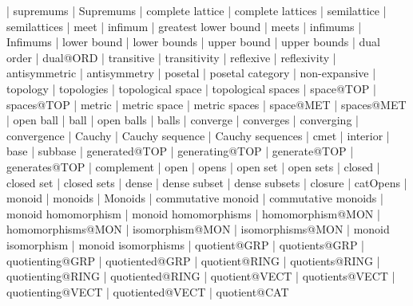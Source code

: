     |   supremums
    |   Supremums
    |   complete lattice
    |   complete lattices
    |   semilattice
    |   semilattices
    |   meet
    |   infimum
    |   greatest lower bound
    |   meets
    |   infimums
    |   Infimums
    |   lower bound
    |   lower bounds
    |   upper bound
    |   upper bounds
    |   dual order
    |   dual@ORD
    |   transitive
    |   transitivity
    |   reflexive
    |   reflexivity
    |   antisymmetric
    |   antisymmetry
    |   posetal
    |   posetal category
    |   non-expansive
    |   topology
    |   topologies
    |   topological space
    |   topological spaces
    |   space@TOP
    |   spaces@TOP
    |   metric
    |   metric space
    |   metric spaces
    |   space@MET
    |   spaces@MET
    |   open ball
    |   ball
    |   open balls
    |   balls
    |   converge
    |   converges
    |   converging
    |   convergence
    |   Cauchy
    |   Cauchy sequence
    |   Cauchy sequences
    |   cmet
    |   interior
    |   base
    |   subbase
    |   generated@TOP
    |   generating@TOP
    |   generate@TOP
    |   generates@TOP
    |   complement
    |   open
    |   opens
    |   open set
    |   open sets
    |   closed
    |   closed set
    |   closed sets
    |   dense
    |   dense subset
    |   dense subsets
    |   closure
    |   catOpens
    |   monoid
    |   monoids
    |   Monoids
    |   commutative monoid
    |   commutative monoids
    |   monoid homomorphism
    |   monoid homomorphisms
    |   homomorphism@MON
    |   homomorphisms@MON
    |   isomorphism@MON
    |   isomorphisms@MON
    |   monoid isomorphism
    |   monoid isomorphisms
    |   quotient@GRP
    |   quotients@GRP
    |   quotienting@GRP
    |   quotiented@GRP
    |   quotient@RING
    |   quotients@RING
    |   quotienting@RING
    |   quotiented@RING
    |   quotient@VECT
    |   quotients@VECT
    |   quotienting@VECT
    |   quotiented@VECT
    |   quotient@CAT
